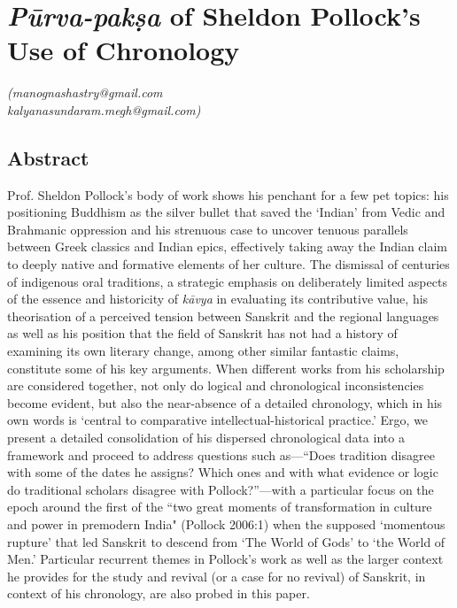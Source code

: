 
\chapter{\textit{Pūrva-pakṣa} of Sheldon Pollock's Use of Chronology}\label{chapter1}





\begin{flushright}
\textit{(manognashastry@gmail.com}\\\textit{kalyanasundaram.megh@gmail.com)}
\end{flushright}


\section*{Abstract}

Prof. Sheldon Pollock’s body of work shows his penchant for a few pet topics: his positioning Buddhism as the silver bullet that saved the ‘Indian’ from Vedic and Brahmanic oppression and his strenuous case to uncover tenuous parallels between Greek classics and Indian epics, effectively taking away the Indian claim to deeply native and formative elements of her culture. The dismissal of centuries of indigenous oral traditions, a strategic emphasis on deliberately limited aspects of the essence and historicity of  \textit{kāvya} in evaluating its contributive value, his theorisation of a perceived tension between Sanskrit and the regional languages as well as his position that the field of Sanskrit has not had a history of examining its own literary change, among other similar fantastic claims, constitute some of his key arguments. When different works from his scholarship are considered together, not only do logical and chronological inconsistencies become evident, but also the near-absence of a detailed chronology, which in his own words is ‘central to comparative intellectual-historical practice.’ Ergo, we present a detailed consolidation of his dispersed chronological data into a framework and proceed to address questions such as—“Does tradition disagree with some of the dates he assigns? Which ones and with what evidence or logic do traditional scholars disagree with Pollock?”—with a particular focus on the epoch around the first of the ``two great moments of transformation in culture and power in premodern India" (Pollock 2006:1) when the supposed ‘momentous rupture’ that led Sanskrit to descend from ‘The World of Gods’ to ‘the World of Men.’ Particular recurrent themes in Pollock’s work as well as the larger context he provides for the study and revival (or a case for no revival) of Sanskrit, in context of his chronology, are also probed in this paper.




